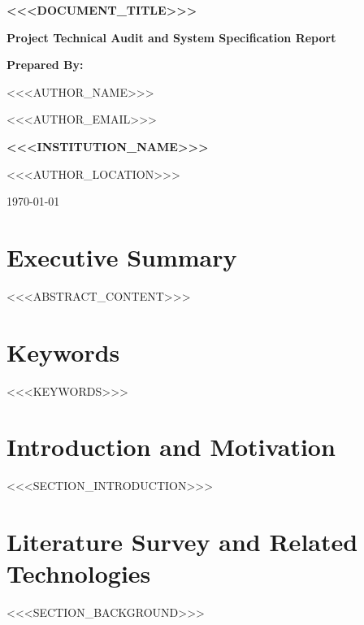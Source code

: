 \documentclass[12pt,oneside,a4paper]{report}
\begin{document}
\begin{titlepage}
    \centering
    \vspace*{1.5cm}
    
    {\Huge \textbf{<<<DOCUMENT_TITLE>>>} \par}
    \vspace{1.2cm}
    {\large \textbf{Project Technical Audit and System Specification Report} \par}
    
    \vspace{2.5cm}
    \textbf{Prepared By:}\\
    {\Large <<<AUTHOR_NAME>>> \par}
    {\normalsize <<<AUTHOR_EMAIL>>> \par}
    
    \vfill
    {\large \textbf{<<<INSTITUTION_NAME>>>} \par}
    {\small <<<AUTHOR_LOCATION>>> \par}
    \vspace{0.8cm}
    {\normalsize \today \par}
\end{titlepage}

\chapter*{Executive Summary}
<<<ABSTRACT_CONTENT>>>

\chapter*{Keywords}
<<<KEYWORDS>>>

\tableofcontents
\newpage
\listoffigures
\listoftables
\newpage


\chapter{Introduction and Motivation}
<<<SECTION_INTRODUCTION>>>

\chapter{Literature Survey and Related Technologies}
<<<SECTION_BACKGROUND>>>
\end{document}
